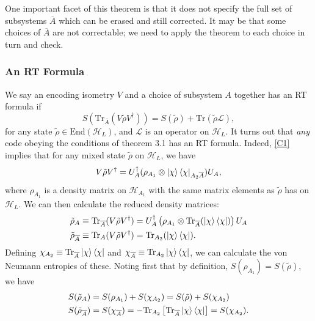 \documentclass[12pt,a4paper]{report}
\numberwithin{equation}{section}
\newcommand{\ketbra}[2]{\ket{#1}\bra{#2}}
\newcommand{\ketbras}[1]{\ketbra{#1}{#1}}
\newcommand{\ol}[1]{\overline{#1}}
\newcommand{\tr}{\text{Tr}}
\theoremstyle{definition}
\theoremstyle{theorem}
\theoremstyle{theorem}
\theoremstyle{example}
\theoremstyle{definition}
\begin{document}
One important facet of this theorem is that it does not specify the full set of subsystems $\ol{A}$ which can be erased and still corrected. It may be that some choices of $\ol{A}$ are not correctable; we need to apply the theorem to each choice in turn and check.
\subsubsection{An RT Formula}
We say an encoding isometry $V$ and a choice of subsystem $A$ together has an RT formula if
\begin{equation}
	S(\tr_{\ol{A}}(V\tilde{\rho}V^{\dagger}))=S(\tilde{\rho})+\tr(\tilde{\rho}\mathcal{L}),
\end{equation}
for any state $\tilde{\rho}\in\text{End}(\mathcal{H}_{L})$, and $\mathcal{L}$ is an operator on $\mathcal{H}_{L}$. It turns out that \textit{any} code obeying the conditions of theorem 3.1 has an RT formula. Indeed, \ref{C1} implies that for any mixed state $\tilde{\rho}$ on $\mathcal{H}_{L}$, we have
\begin{equation}
	V\tilde{\rho}V^{\dagger}=U_{A}^{\dagger}(\rho_{A_{1}}\otimes\ketbras{\chi}_{A_{2}\ol{A}})U_{A},
\end{equation}
where $\rho_{A_{1}}$ is a density matrix on $\mathcal{H}_{A_{1}}$ with the same matrix elements as $\tilde{\rho}$ has on $\mathcal{H}_{L}$. We can then calculate the reduced density matrices:
\begin{equation}
	\begin{aligned}
		\tilde{\rho}_{A}&\equiv\tr_{\ol{A}}(V\tilde{\rho}V^{\dagger})=U_{A}^{\dagger}\left(\rho_{A_{1}}\otimes \tr_{\ol{A}}(\ketbras{\chi})\right)U_{A}\\
		\tilde{\rho}_{\ol{A}}&\equiv\tr_{A}(V\tilde{\rho}V^{\dagger})=\tr_{A_{2}}(\ketbras{\chi}).
	\end{aligned}
\end{equation}
Defining $\chi_{A_{2}}\equiv\tr_{\ol{A}}\ketbras{\chi}$ and $\chi_{\ol{A}}\equiv\tr_{A_{2}}\ketbras{\chi}$, we can calculate the von Neumann entropies of these. Noting first that by definition, $S(\rho_{A_{1}})=S(\tilde{\rho})$, we have
\begin{equation}
	\begin{aligned}
		S(\tilde{\rho}_{A})&=S(\rho_{A_{1}})+S(\chi_{A_{2}})=S(\tilde{\rho})+S(\chi_{A_{2}})\\
		S(\tilde{\rho}_{\ol{A}})&=S(\chi_{\ol{A}})=-\tr_{A_{2}}\left[\tr_{\ol{A}}\ketbras{\chi}\right]=S(\chi_{A_{2}}).
	\end{aligned}
\end{equation}
\end{document}
